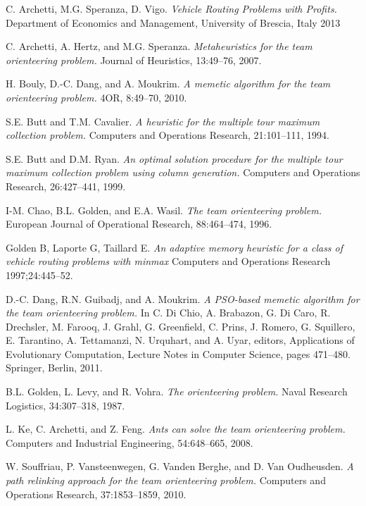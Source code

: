 \renewcommand\bibname{References}
\begin{thebibliography}{9}

C. Archetti, M.G. Speranza, D. Vigo.
\textit{Vehicle Routing Problems with Profits.} 
Department of Economics and Management, University of Brescia, Italy 2013

C. Archetti, A. Hertz, and M.G. Speranza.
\textit{Metaheuristics for the team orienteering problem.} 
Journal of Heuristics, 13:49–76, 2007.

H. Bouly, D.-C. Dang, and A. Moukrim.
\textit{A memetic algorithm for the team orienteering problem.}
4OR, 8:49–70, 2010.

S.E. Butt and T.M. Cavalier.
\textit{A heuristic for the multiple tour maximum collection problem.}
Computers and Operations Research, 21:101–111, 1994.

S.E. Butt and D.M. Ryan.
\textit{An optimal solution procedure for the multiple tour maximum collection problem using column generation.}
Computers and Operations Research, 26:427–441, 1999.

I-M. Chao, B.L. Golden, and E.A. Wasil.
\textit{The team orienteering problem.}
European Journal of Operational Research, 88:464–474, 1996.

Golden B, Laporte G, Taillard E.
\textit{An adaptive memory heuristic for a class of vehicle routing problems with minmax}
Computers and Operations Research 1997;24:445–52.

D.-C. Dang, R.N. Guibadj, and A. Moukrim.
\textit{A PSO-based memetic algorithm for the team orienteering problem.}
In C. Di Chio, A. Brabazon, G. Di Caro, R. Drechsler, M. Farooq, J. Grahl, G. Greenfield, C. Prins, J. Romero, G. Squillero, E. Tarantino, A. Tettamanzi, N. Urquhart, and A. Uyar, editors, Applications of Evolutionary Computation, Lecture Notes in Computer Science, pages 471–480. Springer, Berlin, 2011.

B.L. Golden, L. Levy, and R. Vohra.
\textit{The orienteering problem.}
Naval Research Logistics, 34:307–318, 1987.

L. Ke, C. Archetti, and Z. Feng.
\textit{Ants can solve the team orienteering problem.}
Computers and Industrial Engineering, 54:648–665, 2008.

W. Souffriau, P. Vansteenwegen, G. Vanden Berghe, and D. Van Oudheusden.
\textit{A path relinking approach for the team orienteering problem.}
Computers and Operations Research, 37:1853–1859, 2010.


\end{thebibliography}
